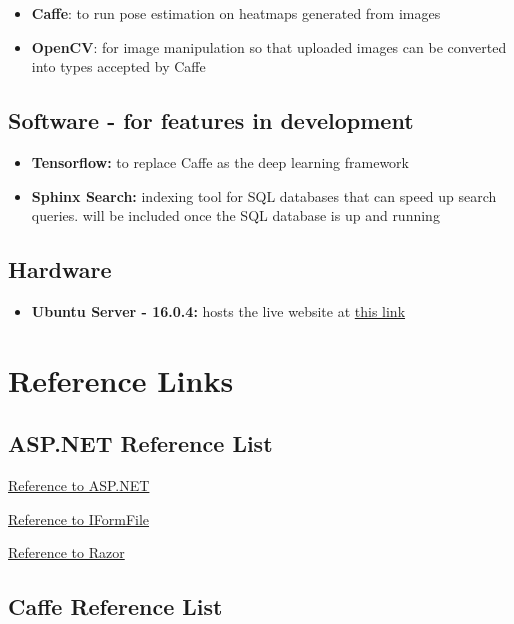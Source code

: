\documentclass{scrreprt}
\begin{document}
\begin{itemize}
    \item \textbf{Caffe}: to run pose estimation on heatmaps generated from images
    \item \textbf{OpenCV}: for image manipulation so that uploaded images can be converted into types accepted by Caffe
\end{itemize}

\section{Software - for features in development}

\begin{itemize}
    \item \textbf{Tensorflow:} to replace Caffe as the deep learning framework
    \item \textbf{Sphinx Search:} indexing tool for SQL databases that can speed up search queries. will be included once the SQL database is up and running
\end{itemize}

\section{Hardware}

\begin{itemize}
    \item \textbf{Ubuntu Server - 16.0.4:} hosts the live website at \href{159.203.10.112}{this link}
\end{itemize}

\chapter{Reference Links}

\section{ASP.NET Reference List}

\href{https://docs.microsoft.com/en-us/aspnet/core/mvc/overview}{Reference to ASP.NET}

\href{https://docs.microsoft.com/en-us/aspnet/core/api/microsoft.aspnetcore.http.iformfile}{Reference to IFormFile}

\href{https://docs.microsoft.com/en-us/aspnet/core/mvc/views/razor}{Reference to Razor}

\section{Caffe Reference List}
\end{document}
